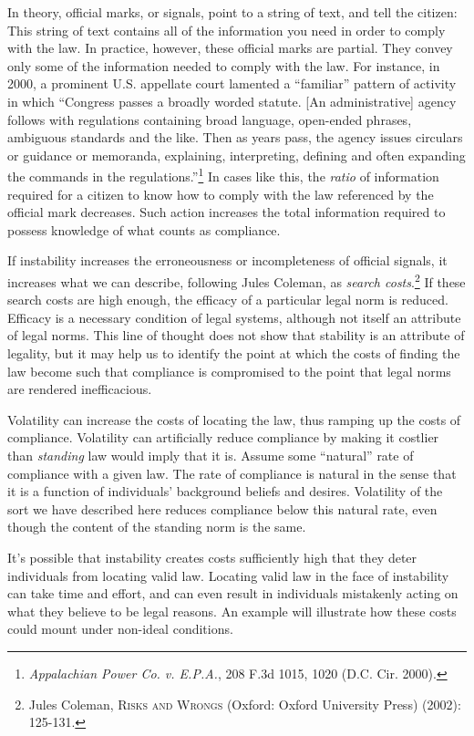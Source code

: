 In theory, official marks, or signals, point to a string of text, and
tell the citizen: This string of text contains all of the information
you need in order to comply with the law. In practice, however, these
official marks are partial. They convey only some of the information
needed to comply with the law. For instance, in 2000, a prominent U.S.
appellate court lamented a ``familiar'' pattern of activity in which
``Congress passes a broadly worded statute. {[}An administrative{]}
agency follows with regulations containing broad language, open-ended
phrases, ambiguous standards and the like. Then as years pass, the
agency issues circulars or guidance or memoranda, explaining,
interpreting, defining and often expanding the commands in the
regulations.''\footnote{\emph{Appalachian Power Co. v. E.P.A.}, 208 F.3d
  1015, 1020 (D.C. Cir. 2000).} In cases like this, the \emph{ratio} of
information required for a citizen to know how to comply with the law
referenced by the official mark decreases. Such action increases the
total information required to possess knowledge of what counts as
compliance.

If instability increases the erroneousness or incompleteness of official
signals, it increases what we can describe, following Jules Coleman, as
\emph{search costs}.\footnote{Jules Coleman, \textsc{Risks and Wrongs}
  (Oxford: Oxford University Press) \textsc{(2002): 125-131.}} If these
search costs are high enough, the efficacy of a particular legal norm is
reduced. Efficacy is a necessary condition of legal systems, although
not itself an attribute of legal norms. This line of thought does not
show that stability is an attribute of legality, but it may help us to
identify the point at which the costs of finding the law become such
that compliance is compromised to the point that legal norms are
rendered inefficacious.

Volatility can increase the costs of locating the law, thus ramping up
the costs of compliance. Volatility can artificially reduce compliance
by making it costlier than \emph{standing} law would imply that it is.
Assume some ``natural'' rate of compliance with a given law. The rate of
compliance is natural in the sense that it is a function of individuals'
background beliefs and desires. Volatility of the sort we have described
here reduces compliance below this natural rate, even though the content
of the standing norm is the same.

It's possible that instability creates costs sufficiently high that they
deter individuals from locating valid law. Locating valid law in the
face of instability can take time and effort, and can even result in
individuals mistakenly acting on what they believe to be legal reasons.
An example will illustrate how these costs could mount under non-ideal
conditions.

